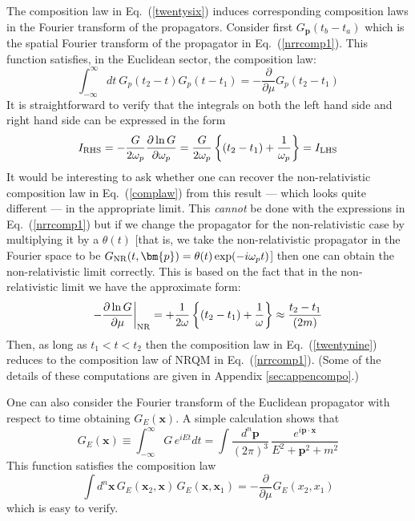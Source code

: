 \documentclass[12pt]{article}
\def\eq#1{{Eq.~(\ref{#1})}}
\begin{document}
The composition law in \eq{twentysix} induces corresponding composition laws in the Fourier transform of the propagators. Consider first $G_{\bm{p}}(t_b-t_a)$ which is the spatial Fourier transform of the propagator in \eq{nrrcomp1}. This function satisfies, in the Euclidean sector, the composition law: 
\begin{equation}
 \int_{-\infty}^\infty dt\ G_p(t_2 -t) G_p(t- t_1) = - \frac{\partial}{\partial \mu} G_p(t_2 - t_1)
 \label{twentynine}
\end{equation}
It is straightforward to verify that the integrals on both the left hand side and right hand side can be expressed in 
 the form
 \begin{equation}
 I_{\rm RHS}  = - \frac{G}{2\omega_p} \frac{\partial \ln G}{\partial \omega_p}
 =\frac{G}{2\omega_p} \left\{ (t_2-t_1) + \frac{1}{\omega_p}\right\}= I_{\rm LHS}
\end{equation}
 It would be interesting to ask whether  one can recover the non-relativistic composition law in \eq{complaw} from this result --- which looks quite different ---  in the appropriate limit. This \textit{cannot} be done with the expressions in \eq{nrrcomp1} but if we change the propagator for the non-relativistic case by multiplying it by a $\theta(t)$ [that is, we take the non-relativistic propagator in the Fourier space to be $G_{\rm NR}(t, \bm{p}) = \theta(t) \exp(-i\omega_p t)$] then one can  obtain the non-relativistic limit correctly. This is based on the fact that in the non-relativistic limit we have the approximate form:
 \begin{equation}
 -\frac{\partial \ln G}{\partial \mu} \bigg|_{\rm NR} = + \frac{1}{2\omega}  \left\{ (t_2-t_1) + \frac{1}{\omega}\right\}
 \approx \frac{t_2 - t_1}{(2m)}
\end{equation}
 Then, as long as $t_1<t<t_2$ then the composition law in \eq{twentynine} reduces to the composition law of NRQM in \eq{nrrcomp1}. (Some of the details of these computations are given in Appendix \ref{sec:appencompo}.)
 

 One can also consider the Fourier transform of the Euclidean propagator with respect to time obtaining $G_E (\bm{x})$. A simple calculation shows that 
\begin{equation}
 G_E(\bm{x}) \equiv \int_{-\infty}^\infty G \, e^{iEt} dt = \int \frac{d^n\bm{p}}{(2\pi)^3} \, \frac{e^{i\bm{p\cdot x}}}{E^2+ \bm{p}^2 + m^2}
\end{equation} 
 This function satisfies  the composition law 
\begin{equation}
 \int d^n \bm{x} \, G_E (\bm{x}_2, \bm{x}) \, G_E(\bm{x}, \bm{x}_1) = - \frac{\partial}{\partial \mu} G_E(x_2, x_1)
\end{equation} 
which is easy to verify. 
\end{document}
